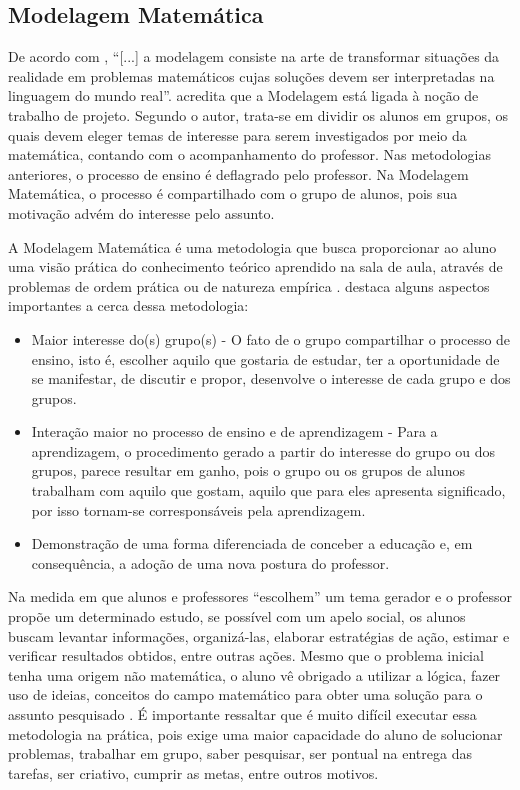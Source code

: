 \subsection{Modelagem Matemática}

De acordo com , ``[...] a modelagem consiste na arte de transformar situações da realidade em 
problemas matemáticos cujas soluções devem ser interpretadas na linguagem do mundo real''.  acredita 
que a Modelagem está ligada \`a noção de trabalho de projeto. Segundo o autor, trata-se em dividir os alunos em grupos, os quais devem 
eleger temas de interesse para serem investigados por meio da matemática, contando com o acompanhamento do professor. Nas metodologias 
anteriores, o processo de ensino é deflagrado pelo professor. Na Modelagem Matemática, o processo é compartilhado com o grupo de 
alunos, pois sua motivação advém do interesse pelo assunto.

A Modelagem Matemática é uma metodologia que busca proporcionar ao aluno uma visão prática do conhecimento teórico aprendido na 
sala de aula, através de problemas de ordem prática ou de natureza empírica \cite{fossa1998tendencias}.  
destaca alguns aspectos importantes a cerca dessa metodologia:

\begin{itemize}
	\item Maior interesse do(s) grupo(s) - O fato de o grupo compartilhar o processo de ensino, isto é, escolher aquilo que gostaria 
 de estudar, ter a oportunidade de se manifestar, de discutir e propor, desenvolve o interesse de cada grupo e dos grupos.
	\item Interação maior no processo de ensino e de aprendizagem - Para a aprendizagem, o procedimento gerado a partir do interesse do 
grupo ou dos grupos, parece resultar em ganho, pois o grupo ou os grupos de alunos trabalham com aquilo que gostam, aquilo que para 
eles apresenta significado, por isso tornam-se corresponsáveis pela aprendizagem.
	\item Demonstração de uma forma diferenciada de conceber a educação e, em consequência, a adoção de uma nova postura do professor. 
\end{itemize}

Na medida em que alunos e professores ``escolhem'' um tema gerador e o professor prop\~oe um determinado estudo, se poss\'ivel 
com um apelo social, os alunos buscam levantar informa\c{c}\~oes, organiz\'a-las, elaborar estratégias de a\c{c}\~ao, estimar e 
verificar resultados obtidos, entre outras a\c{c}\~oes. Mesmo que o problema inicial tenha uma origem n\~ao matem\'atica, o aluno v\^e 
obrigado a utilizar a l\'ogica, fazer uso de ideias, conceitos do campo matem\'atico para obter uma solu\c{c}\~ao para o assunto pesquisado 
\cite{silva2007modelagem}. \'E importante ressaltar que \'e muito difícil executar essa metodologia na pr\'atica, pois exige uma maior 
capacidade do aluno de solucionar problemas, trabalhar em grupo, saber pesquisar, ser pontual na entrega das tarefas, ser criativo, 
cumprir as metas, entre outros motivos.

